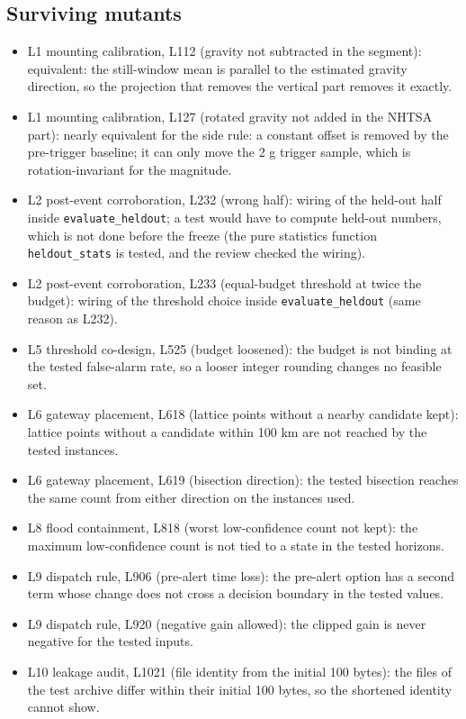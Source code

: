 \subsection*{Surviving mutants}

\begin{itemize}
\item L1 mounting calibration, L112 (gravity not subtracted in the segment): equivalent: the still-window mean is parallel to the estimated gravity direction, so the projection that removes the vertical part removes it exactly.
\item L1 mounting calibration, L127 (rotated gravity not added in the NHTSA part): nearly equivalent for the side rule: a constant offset is removed by the pre-trigger baseline; it can only move the 2 g trigger sample, which is rotation-invariant for the magnitude.
\item L2 post-event corroboration, L232 (wrong half): wiring of the held-out half inside \texttt{evaluate\_heldout}; a test would have to compute held-out numbers, which is not done before the freeze (the pure statistics function \texttt{heldout\_stats} is tested, and the review checked the wiring).
\item L2 post-event corroboration, L233 (equal-budget threshold at twice the budget): wiring of the threshold choice inside \texttt{evaluate\_heldout} (same reason as L232).
\item L5 threshold co-design, L525 (budget loosened): the budget is not binding at the tested false-alarm rate, so a looser integer rounding changes no feasible set.
\item L6 gateway placement, L618 (lattice points without a nearby candidate kept): lattice points without a candidate within 100 km are not reached by the tested instances.
\item L6 gateway placement, L619 (bisection direction): the tested bisection reaches the same count from either direction on the instances used.
\item L8 flood containment, L818 (worst low-confidence count not kept): the maximum low-confidence count is not tied to a state in the tested horizons.
\item L9 dispatch rule, L906 (pre-alert time loss): the pre-alert option has a second term whose change does not cross a decision boundary in the tested values.
\item L9 dispatch rule, L920 (negative gain allowed): the clipped gain is never negative for the tested inputs.
\item L10 leakage audit, L1021 (file identity from the initial 100 bytes): the files of the test archive differ within their initial 100 bytes, so the shortened identity cannot show.

\end{itemize}
